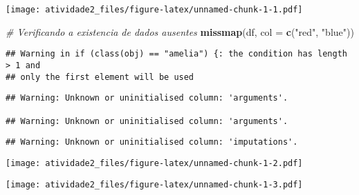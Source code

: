 \documentclass[]{article}
\newenvironment{Shaded}{\begin{snugshade}}{\end{snugshade}}
\newcommand{\CommentTok}[1]{\textcolor[rgb]{0.56,0.35,0.01}{\textit{#1}}}
\newcommand{\DataTypeTok}[1]{\textcolor[rgb]{0.13,0.29,0.53}{#1}}
\newcommand{\KeywordTok}[1]{\textcolor[rgb]{0.13,0.29,0.53}{\textbf{#1}}}
\newcommand{\NormalTok}[1]{#1}
\newcommand{\OperatorTok}[1]{\textcolor[rgb]{0.81,0.36,0.00}{\textbf{#1}}}
\newcommand{\StringTok}[1]{\textcolor[rgb]{0.31,0.60,0.02}{#1}}
\begin{document}
\texttt{[image: atividade2\_files/figure-latex/unnamed-chunk-1-1.pdf]}

\begin{Shaded}
\begin{Highlighting}[]
\CommentTok{# Verificando a existencia de dados ausentes}
\KeywordTok{missmap}\NormalTok{(df, }\DataTypeTok{col =} \KeywordTok{c}\NormalTok{(}\StringTok{"red"}\NormalTok{, }\StringTok{"blue"}\NormalTok{))}
\end{Highlighting}
\end{Shaded}

\begin{verbatim}
## Warning in if (class(obj) == "amelia") {: the condition has length > 1 and
## only the first element will be used
\end{verbatim}

\begin{verbatim}
## Warning: Unknown or uninitialised column: 'arguments'.

## Warning: Unknown or uninitialised column: 'arguments'.
\end{verbatim}

\begin{verbatim}
## Warning: Unknown or uninitialised column: 'imputations'.
\end{verbatim}

\texttt{[image: atividade2\_files/figure-latex/unnamed-chunk-1-2.pdf]}

\begin{Shaded}
\end{Shaded}

\texttt{[image: atividade2\_files/figure-latex/unnamed-chunk-1-3.pdf]}
\end{document}
